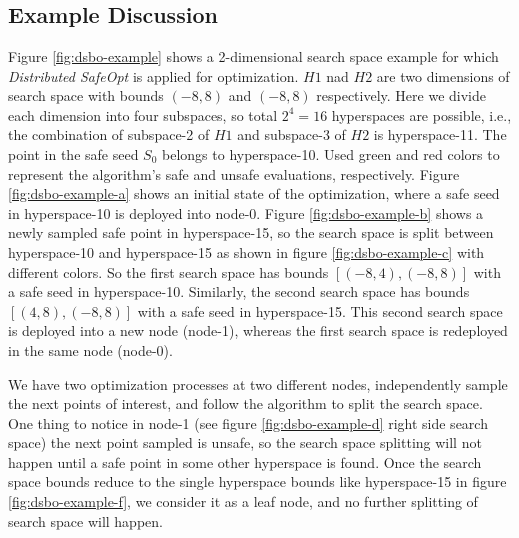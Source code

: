 \chapter{}
\label{chp:appA}

\section{Example Discussion}
Figure \ref{fig:dsbo-example} shows a 2-dimensional search space example for which \textit{Distributed SafeOpt} is applied for optimization. 
$H1$ nad $H2$ are two dimensions of search space with bounds $(-8, 8)$ and $(-8, 8)$ respectively. 
Here we divide each dimension into four subspaces, so total $2^4=16$ hyperspaces are possible, i.e., the combination of subspace-2 of $H1$ and subspace-3 of $H2$ is hyperspace-11. 
The point in the safe seed $S_0$ belongs to hyperspace-10. 
Used green and red colors to represent the algorithm's safe and unsafe evaluations, respectively. 
Figure \ref{fig:dsbo-example-a} shows an initial state of the optimization, where a safe seed in hyperspace-10 is deployed into node-0. 
Figure \ref{fig:dsbo-example-b} shows a newly sampled safe point in hyperspace-15, so the search space is split between hyperspace-10 and hyperspace-15 as shown in figure \ref{fig:dsbo-example-c} with different colors.
So the first search space has bounds $[(-8,4), (-8,8)]$ with a safe seed in hyperspace-10. Similarly, the second search space has bounds $[(4,8),(-8,8)]$ with a safe seed in hyperspace-15.
This second search space is deployed into a new node (node-1), whereas the first search space is redeployed in the same node (node-0).

We have two optimization processes at two different nodes, independently sample the next points of interest, and follow the algorithm to split the search space.
One thing to notice in node-1 (see figure \ref{fig:dsbo-example-d} right side search space) the next point sampled is unsafe, so the search space splitting will not happen until a safe point in some other hyperspace is found.
Once the search space bounds reduce to the single hyperspace bounds like hyperspace-15 in figure \ref{fig:dsbo-example-f}, we consider it as a leaf node, and no further splitting of search space will happen.\\


